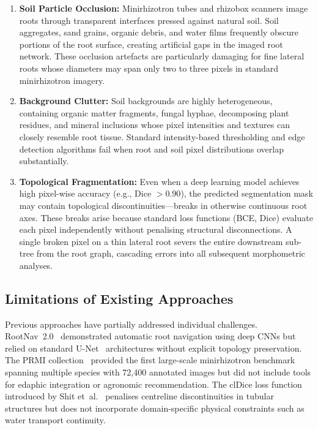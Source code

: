 \documentclass[final,3p,times,nonatbib]{elsarticle}
\begin{document}
\begin{enumerate}
    \item \textbf{Soil Particle Occlusion:} Minirhizotron tubes and rhizobox scanners image roots through transparent interfaces pressed against natural soil. Soil aggregates, sand grains, organic debris, and water films frequently obscure portions of the root surface, creating artificial gaps in the imaged root network. These occlusion artefacts are particularly damaging for fine lateral roots whose diameters may span only two to three pixels in standard minirhizotron imagery.

    \item \textbf{Background Clutter:} Soil backgrounds are highly heterogeneous, containing organic matter fragments, fungal hyphae, decomposing plant residues, and mineral inclusions whose pixel intensities and textures can closely resemble root tissue. Standard intensity-based thresholding and edge detection algorithms fail when root and soil pixel distributions overlap substantially.

    \item \textbf{Topological Fragmentation:} Even when a deep learning model achieves high pixel-wise accuracy (e.g., Dice $> 0.90$), the predicted segmentation mask may contain topological discontinuities---breaks in otherwise continuous root axes. These breaks arise because standard loss functions (BCE, Dice) evaluate each pixel independently without penalising structural disconnections. A single broken pixel on a thin lateral root severs the entire downstream sub-tree from the root graph, cascading errors into all subsequent morphometric analyses.
\end{enumerate}

\subsection{Limitations of Existing Approaches}
Previous approaches have partially addressed individual challenges. RootNav~2.0~\cite{rootnav2019} demonstrated automatic root navigation using deep CNNs but relied on standard U-Net~\cite{ronneberger2015unet} architectures without explicit topology preservation. The PRMI collection~\cite{prmi2022} provided the first large-scale minirhizotron benchmark spanning multiple species with 72,400 annotated images but did not include tools for edaphic integration or agronomic recommendation. The clDice loss function introduced by Shit et~al.~\cite{shit2021cldice} penalises centreline discontinuities in tubular structures but does not incorporate domain-specific physical constraints such as water transport continuity.
\end{document}
